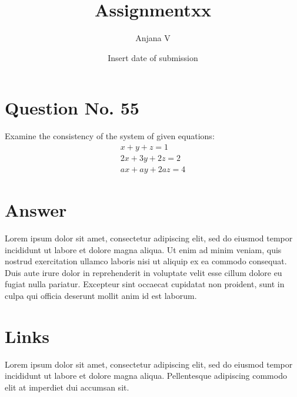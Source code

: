 \documentclass{article}
\title{Assignmentxx}
\author{Anjana V }
\date{Insert date of submission}
\begin{document}
\newcommand{\myvec}[1]{\ensuremath{\begin{pmatrix}#1\end{pmatrix}}}
\renewcommand{\vec}[1]{\mathbf{#1}}
\maketitle
\section{Question No. 55}
Examine the consistency of the system of given equations:
\begin{align}
x+y+z = 1
\\2x+3y+2z = 2
\\ax+ay+2az = 4
\end{align}
\section{Answer}
Lorem ipsum dolor sit amet, consectetur adipiscing elit, sed do eiusmod tempor incididunt ut labore et dolore magna aliqua. Ut enim ad minim veniam, quis nostrud exercitation ullamco laboris nisi ut aliquip ex ea commodo consequat. Duis aute irure dolor in reprehenderit in voluptate velit esse cillum dolore eu fugiat nulla pariatur. Excepteur sint occaecat cupidatat non proident, sunt in culpa qui officia deserunt mollit anim id est laborum.
\section*{Links}
Lorem ipsum dolor sit amet, consectetur adipiscing elit, sed do eiusmod tempor incididunt ut labore et dolore magna aliqua. Pellentesque adipiscing commodo elit at imperdiet dui accumsan sit.
\end{document}
